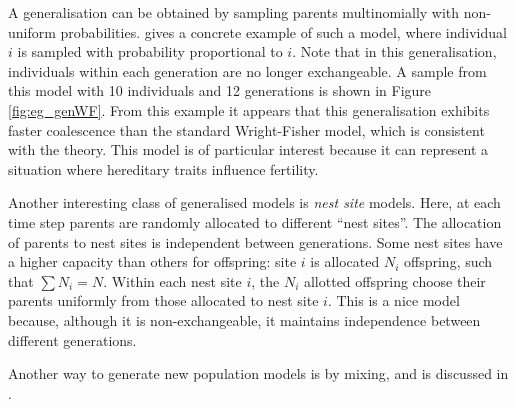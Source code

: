 \documentclass{article}
\begin{document}
A generalisation can be obtained by sampling parents multinomially with non-uniform probabilities. \citet[Section 2]{mohle1998} gives a concrete example of such a model, where individual $i$ is sampled with probability proportional to $i$. Note that in this generalisation, individuals within each generation are no longer exchangeable. 
A sample from this model with 10 individuals and 12 generations is shown in Figure \ref{fig:eg_genWF}. From this example it appears that this generalisation exhibits faster coalescence than the standard Wright-Fisher model, which is consistent with the theory.
This model is of particular interest because it can represent a situation where hereditary traits influence fertility.

Another interesting class of generalised models is \emph{nest site} models. Here, at each time step parents are randomly allocated to different ``nest sites''. The allocation of parents to nest sites is independent between generations. Some nest sites have a higher capacity than others for offspring: site $i$ is allocated $N_i$ offspring, such that $\sum N_i = N$. Within each nest site $i$, the $N_i$ allotted offspring choose their parents uniformly from those allocated to nest site $i$.
This is a nice model because, although it is non-exchangeable, it maintains independence between different generations.

Another way to generate new population models is by mixing, and is discussed in \citet[Section 2]{mohle1998}.
\end{document}
